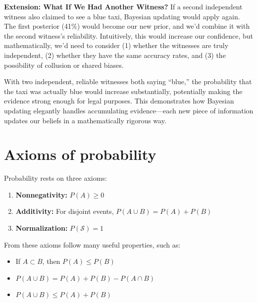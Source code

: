 \documentclass[
  letterpaper,
  DIV=11,
  numbers=noendperiod]{scrreprt}
\providecommand{\tightlist}{%
  \setlength{\itemsep}{0pt}\setlength{\parskip}{0pt}}
\begin{document}
\textbf{Extension: What If We Had Another Witness?} If a second
independent witness also claimed to see a blue taxi, Bayesian updating
would apply again. The first posterior (41\%) would become our new
prior, and we'd combine it with the second witness's reliability.
Intuitively, this would increase our confidence, but mathematically,
we'd need to consider (1) whether the witnesses are truly independent,
(2) whether they have the same accuracy rates, and (3) the possibility
of collusion or shared biases.

With two independent, reliable witnesses both saying ``blue,'' the
probability that the taxi was actually blue would increase
substantially, potentially making the evidence strong enough for legal
purposes. This demonstrates how Bayesian updating elegantly handles
accumulating evidence---each new piece of information updates our
beliefs in a mathematically rigorous way.

\section{Axioms of probability}\label{axioms-of-probability}

Probability rests on three axioms:

\begin{enumerate}
\def\labelenumi{\arabic{enumi}.}
\tightlist
\item
  \textbf{Nonnegativity:} \(P(A) \ge 0\)\\
\item
  \textbf{Additivity:} For disjoint events,
  \(P(A \cup B) = P(A) + P(B)\)\\
\item
  \textbf{Normalization:} \(P(\mathcal{S}) = 1\)
\end{enumerate}

From these axioms follow many useful properties, such as:

\begin{itemize}
\tightlist
\item
  If \(A \subset B\), then \(P(A) \le P(B)\)\\
\item
  \(P(A \cup B) = P(A) + P(B) - P(A \cap B)\)\\
\item
  \(P(A \cup B) \le P(A) + P(B)\)
\end{itemize}
\end{document}
